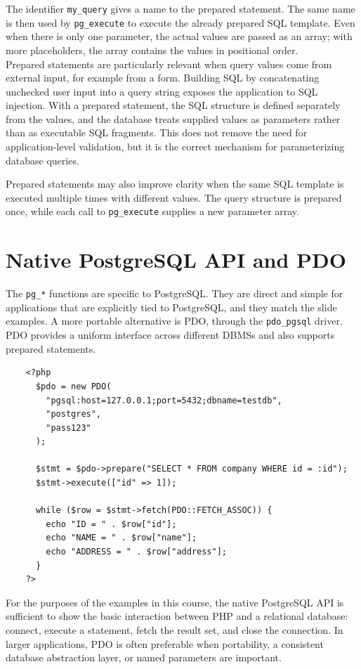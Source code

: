 \documentclass{scrbook}
\begin{document}
	The identifier \texttt{my\_query} gives a name to the prepared statement. The same name is then used by \texttt{pg\_execute} to execute the already prepared SQL template. Even when there is only one parameter, the actual values are passed as an array; with more placeholders, the array contains the values in positional order.\\
	
	Prepared statements are particularly relevant when query values come from external input, for example from a form. Building SQL by concatenating unchecked user input into a query string exposes the application to SQL injection. With a prepared statement, the SQL structure is defined separately from the values, and the database treats supplied values as parameters rather than as executable SQL fragments. This does not remove the need for application-level validation, but it is the correct mechanism for parameterizing database queries.
	
	Prepared statements may also improve clarity when the same SQL template is executed multiple times with different values. The query structure is prepared once, while each call to \texttt{pg\_execute} supplies a new parameter array.
	
	\section{Native PostgreSQL API and PDO}
	
	The \texttt{pg\_*} functions are specific to PostgreSQL. They are direct and simple for applications that are explicitly tied to PostgreSQL, and they match the slide examples. A more portable alternative is PDO, through the \texttt{pdo\_pgsql} driver. PDO provides a uniform interface across different DBMSs and also supports prepared statements.
	
	\begin{lstlisting}
	<?php
	  $pdo = new PDO(
		"pgsql:host=127.0.0.1;port=5432;dbname=testdb",
		"postgres",
		"pass123"
	  );
		
	  $stmt = $pdo->prepare("SELECT * FROM company WHERE id = :id");
	  $stmt->execute(["id" => 1]);
	
	  while ($row = $stmt->fetch(PDO::FETCH_ASSOC)) {
		echo "ID = " . $row["id"];
		echo "NAME = " . $row["name"];
		echo "ADDRESS = " . $row["address"];
	  }
	?>
	\end{lstlisting}
	
	For the purposes of the examples in this course, the native PostgreSQL API is sufficient to show the basic interaction between PHP and a relational database: connect, execute a statement, fetch the result set, and close the connection. In larger applications, PDO is often preferable when portability, a consistent database abstraction layer, or named parameters are important.
	
\end{document}
